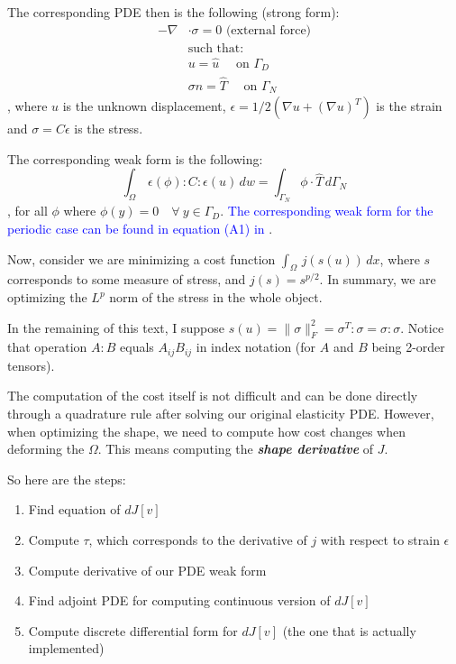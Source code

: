 \documentclass[11pt]{article}
\newcommand{\blue}{\textcolor{blue}}
\begin{document}
The corresponding PDE then is the following (strong form):
\begin{align*}
  - \nabla & \cdot \sigma = 0 \text{ (external force)} \\
  &\text{such that: } \\
  &u =  \hat u \quad \text{ on $\Gamma_D$}\\
  &\sigma n = \hat T \quad \text{ on $\Gamma_N$}
\end{align*}
, where $u$ is the unknown displacement, $\epsilon = 1/2 (\nabla u + (\nabla u)^T)$ is the strain and $\sigma = C \epsilon$ is the stress.

The corresponding weak form is the following:
\begin{equation}
\int_\Omega\, \epsilon(\phi) : C : \epsilon(u)\, dw = \int_{\Gamma_N} \phi \cdot \hat T\, d\Gamma_N
  \label{eq:weakform}
\end{equation}
, for all $\phi$ where $\phi(y) = 0 \quad \forall \:  y \in \Gamma_D$. \blue{The corresponding weak form for the periodic case can be found in equation (A1) in \cite{panetta2017}}.

Now, consider we are minimizing a cost function $\int_\Omega\, j(s(u))\, dx$, where $s$ corresponds to some measure of stress, and $j(s) = s^{p/2}$. In summary, we are optimizing the $L^p$ norm of the stress in the whole object.

In the remaining of this text, I suppose $s(u) = \| \sigma \|^2_F = \sigma^T : \sigma = \sigma : \sigma$. Notice that operation $A:B$ equals $A_{ij} B_{ij}$ in index notation (for $A$ and $B$ being 2-order tensors).

The computation of the cost itself is not difficult and can be done directly through a quadrature rule after solving our original elasticity PDE. However, when optimizing the shape, we need to compute how cost changes when deforming the $\Omega$. This means computing the \textbf{\emph{shape derivative}} of $J$.

So here are the steps:
\begin{enumerate}
  \item Find equation of $dJ[v]$
  \item Compute $\tau$, which corresponds to the derivative of $j$ with respect to strain $\epsilon$
  \item Compute derivative of our PDE weak form
  \item Find adjoint PDE for computing continuous version of $dJ[v]$
  \item Compute discrete differential form for $dJ[v]$ (the one that is actually implemented)
\end{enumerate}
\end{document}

